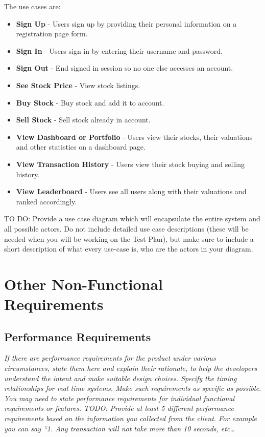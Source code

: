 \documentclass[12 pt, a4paper]{report}
\begin{document}
The use cases are:
\begin{itemize}
\item \textbf{Sign Up} - Users sign up by providing their personal information on a registration page form.
\item \textbf{Sign In} - Users sign in by entering their username and password.
\item \textbf{Sign Out} - End signed in session so no one else accesses an account.
\item \textbf{See Stock Price} - View stock listings.
\item \textbf{Buy Stock} - Buy stock and add it to account.
\item \textbf{Sell Stock} - Sell stock already in account.
\item \textbf{View Dashboard or Portfolio} - Users view their stocks, their valuations and other statistics on a dashboard page.
\item \textbf{View Transaction History} - Users view their stock buying and selling history.
\item \textbf{View Leaderboard} - Users see all users along with their valuations and ranked accordingly.
\end{itemize}
	
	TO DO: Provide a use case diagram which will encapsulate the entire system and all possible actors. Do not include detailed use case descriptions (these will be needed when you will be working on the Test Plan), but make sure to include a short description of what every use-case is, who are the actors in your diagram.
	
	\chapter {Other Non-Functional Requirements}
	\section {Performance Requirements}
	\textit{If there are performance requirements for the product under various circumstances, state them here and explain their rationale, to help the developers understand the intent and make suitable design choices. Specify the timing relationships for real time systems. Make such requirements as specific as possible. You may need to state performance requirements for individual functional requirements or features. 
	TODO: Provide at least 5 different performance requirements based on the information you collected from the client. For example you can say “1. Any transaction will not take more than 10 seconds, etc…}
\end{document}
